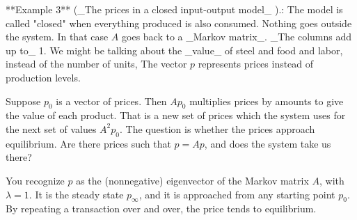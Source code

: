 **Example 3** (_The prices in a closed input-output model_ ).: The model is called "closed" when everything produced is also consumed. Nothing goes outside the system. In that case \(A\) goes back to a _Markov matrix_. _The columns add up to_ 1. We might be talking about the _value_ of steel and food and labor, instead of the number of units, The vector \(p\) represents prices instead of production levels.

Suppose \(p_{0}\) is a vector of prices. Then \(Ap_{0}\) multiplies prices by amounts to give the value of each product. That is a new set of prices which the system uses for the next set of values \(A^{2}p_{0}\). The question is whether the prices approach equilibrium. Are there prices such that \(p=Ap\), and does the system take us there?

You recognize \(p\) as the (nonnegative) eigenvector of the Markov matrix \(A\), with \(\lambda=1\). It is the steady state \(p_{\infty}\), and it is approached from any starting point \(p_{0}\). By repeating a transaction over and over, the price tends to equilibrium.

 